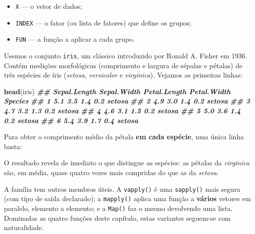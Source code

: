 \documentclass[
  portuguese,
  11pt,
  openany]{book}
\newenvironment{Shaded}{\begin{snugshade}}{\end{snugshade}}
\newcommand{\DocumentationTok}[1]{\textcolor[rgb]{0.56,0.35,0.01}{\textbf{\textit{#1}}}}
\newcommand{\FunctionTok}[1]{\textcolor[rgb]{0.13,0.29,0.53}{\textbf{#1}}}
\newcommand{\NormalTok}[1]{#1}
\newcommand{\SpecialCharTok}[1]{\textcolor[rgb]{0.81,0.36,0.00}{\textbf{#1}}}
\providecommand{\tightlist}{%
  \setlength{\itemsep}{0pt}\setlength{\parskip}{0pt}}
\begin{document}
\begin{itemize}
\tightlist
\item
  \texttt{X} --- o vetor de dados;
\item
  \texttt{INDEX} --- o fator (ou lista de fatores) que define os grupos;
\item
  \texttt{FUN} --- a função a aplicar a cada grupo.
\end{itemize}

Usemos o conjunto \texttt{iris}, um clássico introduzido por Ronald A. Fisher em 1936. Contém
medições morfológicas (comprimento e largura de sépalas e pétalas) de três espécies de
íris (\emph{setosa}, \emph{versicolor} e \emph{virginica}). Vejamos as primeiras linhas:

\begin{Shaded}
\begin{Highlighting}[]
\FunctionTok{head}\NormalTok{(iris)}
\DocumentationTok{\#\#   Sepal.Length Sepal.Width Petal.Length Petal.Width Species}
\DocumentationTok{\#\# 1          5.1         3.5          1.4         0.2  setosa}
\DocumentationTok{\#\# 2          4.9         3.0          1.4         0.2  setosa}
\DocumentationTok{\#\# 3          4.7         3.2          1.3         0.2  setosa}
\DocumentationTok{\#\# 4          4.6         3.1          1.5         0.2  setosa}
\DocumentationTok{\#\# 5          5.0         3.6          1.4         0.2  setosa}
\DocumentationTok{\#\# 6          5.4         3.9          1.7         0.4  setosa}
\end{Highlighting}
\end{Shaded}

Para obter o comprimento médio da pétala \textbf{em cada espécie}, uma única linha basta:

\begin{Shaded}
\end{Shaded}

O resultado revela de imediato o que distingue as espécies: as pétalas da \emph{virginica}
são, em média, quase quatro vezes mais compridas do que as da \emph{setosa}.

A família tem outros membros úteis. A \texttt{vapply()} é uma \texttt{sapply()} mais segura (com tipo
de saída declarado); a \texttt{mapply()} aplica uma função a \textbf{vários} vetores em paralelo,
elemento a elemento; e a \texttt{Map()} faz o mesmo devolvendo uma lista. Dominadas as
quatro funções deste capítulo, estas variantes seguem-se com naturalidade.
\end{document}
